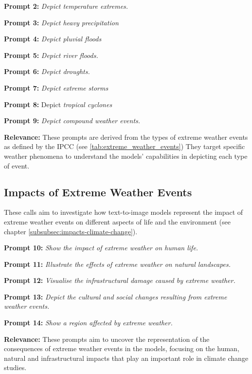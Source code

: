 \begin{description}
\item \textbf{Prompt 2:} \textit{Depict temperature extremes.}
\item \textbf{Prompt 3:} \textit{Depict heavy precipitation}
\item \textbf{Prompt 4:} \textit{Depict pluvial floods}
\item \textbf{Prompt 5:} \textit{Depict river floods.}
\item \textbf{Prompt 6:} \textit{Depict droughts.}
\item \textbf{Prompt 7:} \textit{Depict extreme storms}
\item \textbf{Prompt 8:} Depict \textit{tropical cyclones}
\item \textbf{Prompt 9:} \textit{Depict compound weather events.}
\end{description}
\textbf{Relevance:} These prompts are derived from the types of extreme weather events as defined by the IPCC (see \ref{tab:extreme_weather_events}) They target specific weather phenomena to understand the models' capabilities in depicting each type of event.

\subsection{Impacts of Extreme Weather Events}
These calls aim to investigate how text-to-image models represent the impact of extreme weather events on different aspects of life and the environment (see chapter \ref{subsubsec:impacts-climate-change}).

\begin{description}
\item \textbf{Prompt 10:} \textit{Show the impact of extreme weather on human life.}
\item \textbf{Prompt 11:} \textit{Illustrate the effects of extreme weather on natural landscapes.}
\item \textbf{Prompt 12:} \textit{Visualise the infrastructural damage caused by extreme weather.}
\item \textbf{Prompt 13:} \textit{Depict the cultural and social changes resulting from extreme weather events.}
\item \textbf{Prompt 14:} \textit{Show a region affected by extreme weather.}
\end{description}
\textbf{Relevance:} These prompts aim to uncover the representation of the consequences of extreme weather events in the models, focusing on the human, natural and infrastructural impacts that play an important role in climate change studies.

